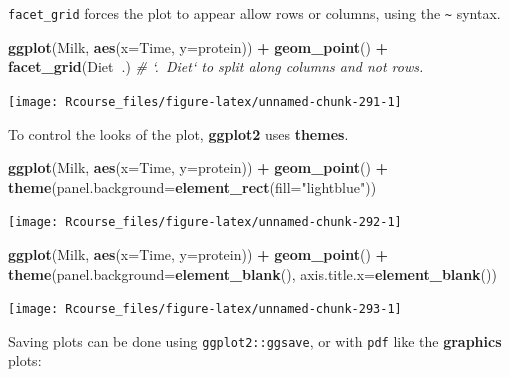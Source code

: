 \documentclass[]{book}
\newenvironment{Shaded}{\begin{snugshade}}{\end{snugshade}}
\newcommand{\CommentTok}[1]{\textcolor[rgb]{0.56,0.35,0.01}{\textit{#1}}}
\newcommand{\DataTypeTok}[1]{\textcolor[rgb]{0.13,0.29,0.53}{#1}}
\newcommand{\KeywordTok}[1]{\textcolor[rgb]{0.13,0.29,0.53}{\textbf{#1}}}
\newcommand{\NormalTok}[1]{#1}
\newcommand{\OperatorTok}[1]{\textcolor[rgb]{0.81,0.36,0.00}{\textbf{#1}}}
\newcommand{\StringTok}[1]{\textcolor[rgb]{0.31,0.60,0.02}{#1}}
\theoremstyle{definition}
\theoremstyle{definition}
\theoremstyle{definition}
\theoremstyle{remark}
\begin{document}
\texttt{facet\_grid} forces the plot to appear allow rows or columns, using the \texttt{\textasciitilde{}} syntax.

\begin{Shaded}
\begin{Highlighting}[]
\KeywordTok{ggplot}\NormalTok{(Milk, }\KeywordTok{aes}\NormalTok{(}\DataTypeTok{x=}\NormalTok{Time, }\DataTypeTok{y=}\NormalTok{protein)) }\OperatorTok{+}
\StringTok{  }\KeywordTok{geom_point}\NormalTok{() }\OperatorTok{+}
\StringTok{  }\KeywordTok{facet_grid}\NormalTok{(Diet}\OperatorTok{~}\NormalTok{.) }\CommentTok{# `.~Diet` to split along columns and not rows.}
\end{Highlighting}
\end{Shaded}

\texttt{[image: Rcourse\_files/figure-latex/unnamed-chunk-291-1]}

To control the looks of the plot, \textbf{ggplot2} uses \textbf{themes}.

\begin{Shaded}
\begin{Highlighting}[]
\KeywordTok{ggplot}\NormalTok{(Milk, }\KeywordTok{aes}\NormalTok{(}\DataTypeTok{x=}\NormalTok{Time, }\DataTypeTok{y=}\NormalTok{protein)) }\OperatorTok{+}
\StringTok{  }\KeywordTok{geom_point}\NormalTok{() }\OperatorTok{+}
\StringTok{  }\KeywordTok{theme}\NormalTok{(}\DataTypeTok{panel.background=}\KeywordTok{element_rect}\NormalTok{(}\DataTypeTok{fill=}\StringTok{"lightblue"}\NormalTok{))}
\end{Highlighting}
\end{Shaded}

\texttt{[image: Rcourse\_files/figure-latex/unnamed-chunk-292-1]}

\begin{Shaded}
\begin{Highlighting}[]
\KeywordTok{ggplot}\NormalTok{(Milk, }\KeywordTok{aes}\NormalTok{(}\DataTypeTok{x=}\NormalTok{Time, }\DataTypeTok{y=}\NormalTok{protein)) }\OperatorTok{+}
\StringTok{  }\KeywordTok{geom_point}\NormalTok{() }\OperatorTok{+}
\StringTok{  }\KeywordTok{theme}\NormalTok{(}\DataTypeTok{panel.background=}\KeywordTok{element_blank}\NormalTok{(),}
        \DataTypeTok{axis.title.x=}\KeywordTok{element_blank}\NormalTok{())}
\end{Highlighting}
\end{Shaded}

\texttt{[image: Rcourse\_files/figure-latex/unnamed-chunk-293-1]}

Saving plots can be done using \texttt{ggplot2::ggsave}, or with \texttt{pdf} like the \textbf{graphics} plots:
\end{document}
